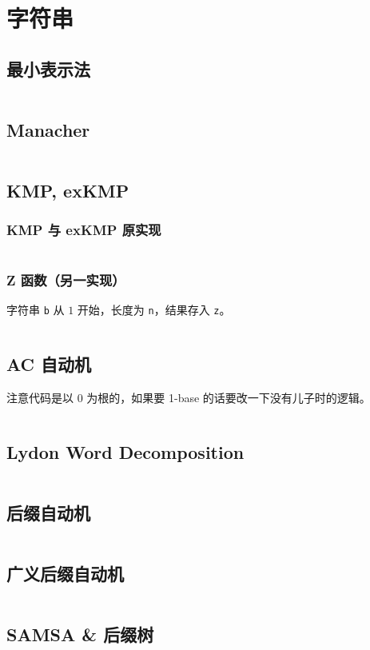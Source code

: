 			\section{字符串}
				\subsection{最小表示法}
					\inputminted{cpp}{sections/String/assets/String/最小表示法.cpp}
				\subsection{Manacher}
					\inputminted{cpp}{sections/String/assets/String/Manacher.cpp}
				\subsection{KMP, exKMP}
					\subsubsection{KMP 与 exKMP 原实现}
					\inputminted{cpp}{sections/String/assets/String/KMP.cpp}
					\subsubsection{Z 函数（另一实现）}
					字符串 \texttt{b} 从 $1$ 开始，长度为 \texttt{n}，结果存入 \texttt{z}。
					\inputminted{cpp}{sections/String/assets/String/EXKMP.cpp}
				\subsection{AC 自动机}
					注意代码是以 0 为根的，如果要 1-base 的话要改一下没有儿子时的逻辑。
					\inputminted{cpp}{sections/String/assets/String/AC 自动机.cpp}
				\subsection{Lydon Word Decomposition}
					\inputminted{cpp}{sections/String/assets/String/Lyndon Word.cpp}
				\subsection{后缀自动机}
					\inputminted{cpp}{sections/String/assets/String/SAM.cpp}
				\subsection{广义后缀自动机}
					\inputminted{cpp}{sections/String/assets/String/广义SAM.cpp}
				\subsection{SAMSA \& 后缀树}
					\inputminted{cpp}{sections/String/assets/String/SAMSA.cpp}
